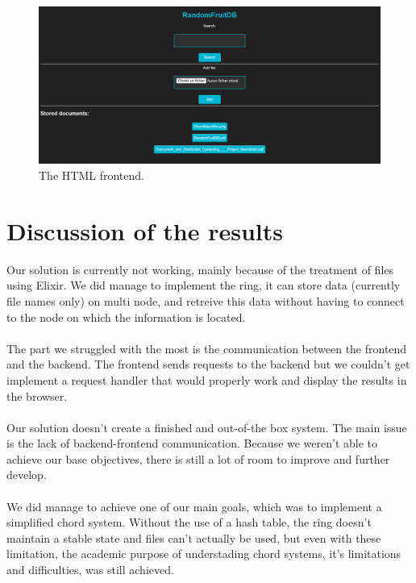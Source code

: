 \documentclass{article}
\begin{document}
\begin{figure}[!htbp]
  \centering
  \includegraphics[width=\textwidth]{img/html.png}
  \caption{The HTML frontend.}
  \label{figure 3 :}
\end{figure}


\section{Discussion of the results}
Our solution is currently not working, mainly because of the treatment of files using Elixir. We did manage to implement the ring, it can store data (currently file names only) on multi node, and retreive this data without having to connect to the node on which the information is located.
\\\\
The part we struggled with the most is the communication between the frontend and the backend. The frontend sends requests to the backend but we couldn't get implement a request handler that would properly work and display the results in the browser.
\\\\
Our solution doesn't create a finished and out-of-the box system. The main issue is the lack of backend-frontend communication. Because we weren't able to achieve our base objectives, there is still a lot of room to improve and further develop.
\\\\
We did manage to achieve one of our main goals, which was to implement a simplified chord system. Without the use of a hash table, the ring doesn't maintain a stable state and files can't actually be used, but even with these limitation, the academic purpose of understading chord systems, it's limitations and difficulties, was still achieved.




\pagebreak
\end{document}

